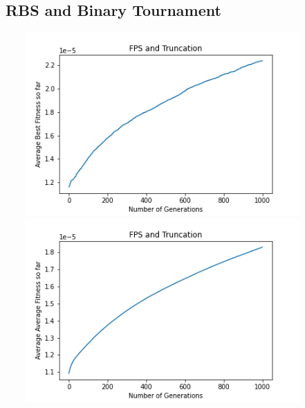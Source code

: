 \documentclass[a4paper]{article}
\begin{document}
\subsection{RBS and Binary Tournament}
\includegraphics[width=12cm, height=7cm]{Graphs/TSP/fps_trunc_bsf.png} \\
\includegraphics[width=12cm, height=7cm]{Graphs/TSP/fps_trunc_avg.png} \\
\end{document}

